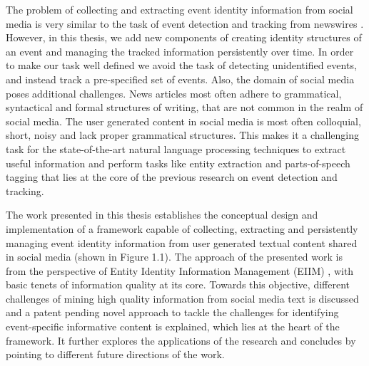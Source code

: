 \documentclass[11pt, oneside]{Thesis} %
\begin{document}
The problem of collecting and extracting event identity information from social media is very similar to the task of event detection and tracking from newswires \cite{allan1998line,kumaran2004text}. However, in this thesis, we add new components of creating identity structures of an event and managing the tracked information persistently over time. In order to make our task well defined we avoid the task of detecting unidentified events, and instead track a pre-specified set of events. Also, the domain of social media poses additional challenges. News articles most often adhere to grammatical, syntactical and formal structures of writing, that are not common in the realm of social media. The user generated content in social media is most often colloquial, short, noisy and lack proper grammatical structures. This makes it a challenging task for the state-of-the-art natural language processing techniques to extract useful information and perform tasks like entity extraction and parts-of-speech tagging that lies at the core of the previous research on event detection and tracking.

The work presented in this thesis establishes the conceptual design and implementation of a framework capable of collecting, extracting and persistently managing event identity information from user generated textual content shared in social media (shown in Figure 1.1). The approach of the presented work is from the perspective of Entity Identity Information Management (EIIM) \cite{zhou2011entity}, with basic tenets of information quality at its core. Towards this objective, different challenges of mining high quality information from social media text is discussed and a patent pending novel approach to tackle the challenges for identifying event-specific informative content is explained, which lies at the heart of the framework. It further explores the applications of the research and concludes by pointing to different future directions of the work. 


\end{document}
